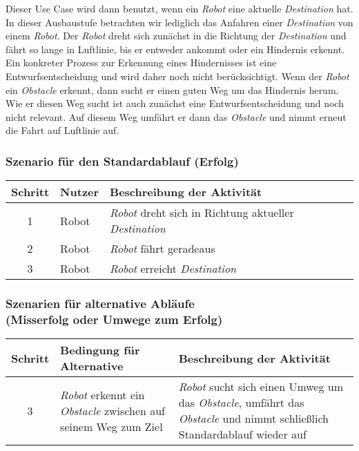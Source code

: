 			Dieser Use Case wird dann benutzt, wenn ein \emph{Robot} eine aktuelle
			\emph{Destination} hat. In dieser Ausbaustufe betrachten wir lediglich das Anfahren
			einer \emph{Destination} von einem \emph{Robot}. Der \emph{Robot} dreht sich zunächst in die
			Richtung der \emph{Destination} und fährt so lange in Luftlinie, bis er entweder
			ankommt oder ein Hindernis erkennt. Ein konkreter Prozess zur Erkennung
			eines Hindernisses ist eine Entwurfsentscheidung und wird daher noch
			nicht berücksichtigt. Wenn der \emph{Robot} ein \emph{Obstacle} erkennt, dann
			sucht er einen guten Weg um das Hindernis herum. Wie er diesen Weg sucht
			ist auch zunächst eine Entwurfsentscheidung und noch nicht relevant. Auf
			diesem Weg umfährt er dann das \emph{Obstacle} und nimmt erneut die Fahrt auf
			Luftlinie auf.

			\subsubsection*{Szenario für den Standardablauf (Erfolg)}

			\begin{table}[H]
				\centering
				\begin{tabularx}{\textwidth}{@{}cp{2cm}X@{}}
				\toprule
				Schritt & Nutzer & Beschreibung der Aktivität \\ \midrule
				1 & Robot & \emph{Robot} dreht sich in Richtung aktueller \emph{Destination} \\
				2 & Robot & \emph{Robot} fährt geradeaus \\
				3 & Robot & \emph{Robot} erreicht \emph{Destination} \\
				\bottomrule
				\end{tabularx}
			\end{table}

			\subsubsection*{Szenarien für alternative Abläufe\\ (Misserfolg oder Umwege zum Erfolg)}

			\begin{table}[H]
				\centering
				\begin{tabularx}{\textwidth}{@{}cp{6cm}X@{}}
				\toprule
				Schritt & Bedingung für Alternative & Beschreibung der Aktivität \\ \midrule
				3 & \emph{Robot} erkennt ein \emph{Obstacle} zwischen auf seinem Weg zum Ziel & \emph{Robot} sucht sich einen Umweg um das \emph{Obstacle}, umfährt das \emph{Obstacle} und nimmt schließlich Standardablauf wieder auf \\
				\bottomrule
				\end{tabularx}
			\end{table}

